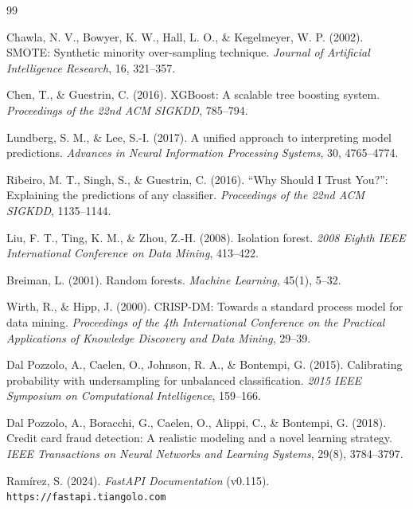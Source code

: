 \documentclass[12pt,a4paper,twoside]{report}
\theoremstyle{definition}
\begin{document}
\begin{thebibliography}{99}

Chawla, N. V., Bowyer, K. W., Hall, L. O., \& Kegelmeyer, W. P. (2002).
SMOTE: Synthetic minority over-sampling technique.
\textit{Journal of Artificial Intelligence Research}, 16, 321--357.

Chen, T., \& Guestrin, C. (2016).
XGBoost: A scalable tree boosting system.
\textit{Proceedings of the 22nd ACM SIGKDD}, 785--794.

Lundberg, S. M., \& Lee, S.-I. (2017).
A unified approach to interpreting model predictions.
\textit{Advances in Neural Information Processing Systems}, 30, 4765--4774.

Ribeiro, M. T., Singh, S., \& Guestrin, C. (2016).
``Why Should I Trust You?'': Explaining the predictions of any classifier.
\textit{Proceedings of the 22nd ACM SIGKDD}, 1135--1144.

Liu, F. T., Ting, K. M., \& Zhou, Z.-H. (2008).
Isolation forest.
\textit{2008 Eighth IEEE International Conference on Data Mining}, 413--422.

Breiman, L. (2001).
Random forests.
\textit{Machine Learning}, 45(1), 5--32.

Wirth, R., \& Hipp, J. (2000).
CRISP-DM: Towards a standard process model for data mining.
\textit{Proceedings of the 4th International Conference on the Practical
Applications of Knowledge Discovery and Data Mining}, 29--39.

Dal Pozzolo, A., Caelen, O., Johnson, R. A., \& Bontempi, G. (2015).
Calibrating probability with undersampling for unbalanced classification.
\textit{2015 IEEE Symposium on Computational Intelligence}, 159--166.

Dal Pozzolo, A., Boracchi, G., Caelen, O., Alippi, C., \& Bontempi, G. (2018).
Credit card fraud detection: A realistic modeling and a novel learning strategy.
\textit{IEEE Transactions on Neural Networks and Learning Systems}, 29(8),
3784--3797.

Ramírez, S. (2024).
\textit{FastAPI Documentation} (v0.115).
\texttt{https://fastapi.tiangolo.com}


\end{thebibliography}
\end{document}
